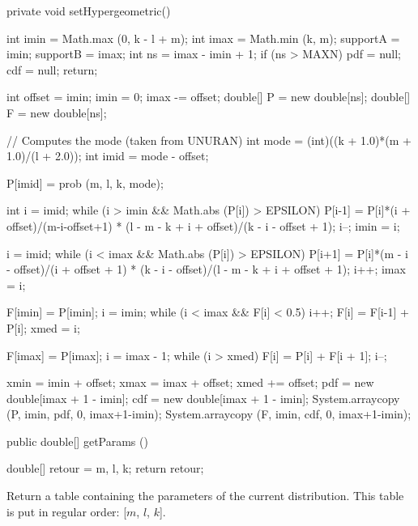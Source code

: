 \begin{code}\begin{hide}
   private void setHypergeometric() {
      int imin = Math.max (0, k - l + m);
      int imax = Math.min (k, m);
      supportA = imin;
      supportB = imax;
      int ns = imax - imin + 1;
      if (ns > MAXN) {
         pdf = null;
         cdf = null;
         return;
      }

      int offset = imin;
      imin = 0;
      imax -= offset;
      double[] P = new double[ns];
      double[] F = new double[ns];

      // Computes the mode (taken from UNURAN)
      int mode = (int)((k + 1.0)*(m + 1.0)/(l + 2.0));
      int imid = mode - offset;

      P[imid] = prob (m, l, k, mode);

      int i = imid;
      while (i > imin && Math.abs (P[i]) > EPSILON) {
         P[i-1] = P[i]*(i + offset)/(m-i-offset+1)
                  * (l - m - k + i + offset)/(k - i - offset + 1);
         i--;
      }
      imin = i;

      i = imid;
      while (i < imax && Math.abs (P[i]) > EPSILON) {
         P[i+1] = P[i]*(m - i - offset)/(i + offset + 1)
                  * (k - i - offset)/(l - m - k + i + offset + 1);
         i++;
      }
      imax = i;

      F[imin] = P[imin];
      i = imin;
      while (i < imax && F[i] < 0.5) {
         i++;
         F[i] = F[i-1] + P[i];
      }
      xmed = i;

      F[imax] = P[imax];
      i = imax - 1;
      while (i > xmed) {
         F[i] = P[i] + F[i + 1];
         i--;
      }

       xmin = imin + offset;
       xmax = imax + offset;
       xmed += offset;
       pdf  = new double[imax + 1 - imin];
       cdf  = new double[imax + 1 - imin];
       System.arraycopy (P, imin, pdf, 0, imax+1-imin);
       System.arraycopy (F, imin, cdf, 0, imax+1-imin);
   }
\end{hide}

   public double[] getParams ()\begin{hide} {
      double[] retour = {m, l, k};
      return retour;
   }\end{hide}
\end{code}
\begin{tabb}
   Return a table containing the parameters of the current distribution.
   This table is put in regular order: [$m$, $l$, $k$].
\end{tabb}
